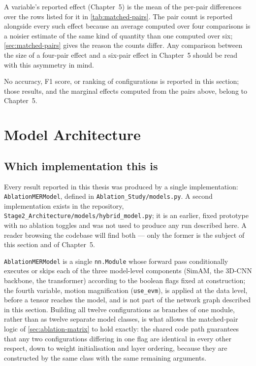 A variable's reported effect (Chapter~5) is the mean of the per-pair differences over the rows listed for it in \autoref{tab:matched-pairs}. The pair count is reported alongside every such effect because an average computed over four comparisons is a noisier estimate of the same kind of quantity than one computed over six; \autoref{sec:matched-pairs} gives the reason the counts differ. Any comparison between the size of a four-pair effect and a six-pair effect in Chapter~5 should be read with this asymmetry in mind.

No accuracy, F1 score, or ranking of configurations is reported in this section; those results, and the marginal effects computed from the pairs above, belong to Chapter~5.


\section{Model Architecture}
\label{sec:architecture}

\subsection{Which implementation this is}
\label{sec:which-implementation}

Every result reported in this thesis was produced by a single implementation: \texttt{AblationMERModel}, defined in \texttt{Ablation\_Study/models.py}. A second implementation exists in the repository, \texttt{Stage2\_Architecture/models/hybrid\_model.py}; it is an earlier, fixed prototype with no ablation toggles and was not used to produce any run described here. A reader browsing the codebase will find both --- only the former is the subject of this section and of Chapter~5.

\texttt{AblationMERModel} is a single \texttt{nn.Module} whose forward pass conditionally executes or skips each of the three model-level components (SimAM, the 3D-CNN backbone, the transformer) according to the boolean flags fixed at construction; the fourth variable, motion magnification (\texttt{use\_evm}), is applied at the data level, before a tensor reaches the model, and is not part of the network graph described in this section. Building all twelve configurations as branches of one module, rather than as twelve separate model classes, is what allows the matched-pair logic of \autoref{sec:ablation-matrix} to hold exactly: the shared code path guarantees that any two configurations differing in one flag are identical in every other respect, down to weight initialisation and layer ordering, because they are constructed by the same class with the same remaining arguments.

